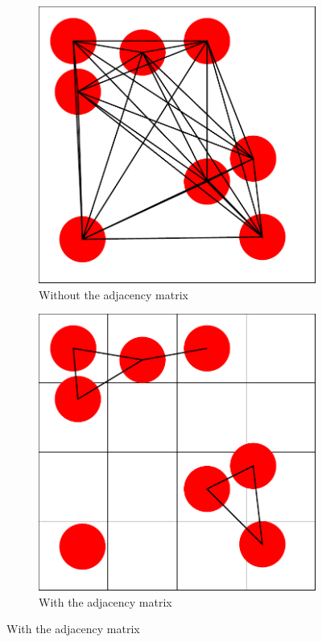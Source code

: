 \documentclass[12pt, oneside]{report}
\begin{document}
\begin{figure}[H]
  \centering

  \begin{subfigure}[b]{0.4\linewidth}
    \includegraphics[width=\linewidth,height=\linewidth]{Images/CieslaAlgorithm/adjmatrix0.pdf}
    \caption{Without the adjacency matrix}
  \end{subfigure}
  \begin{subfigure}[b]{0.4\linewidth}
    \includegraphics[width=\linewidth,height=\linewidth]{Images/CieslaAlgorithm/adjmatrix1.pdf}
    \caption{With the adjacency matrix}
  \end{subfigure}


\end{figure}
\end{document}
